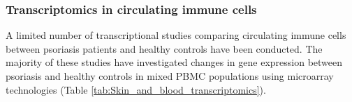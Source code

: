 \subsubsection{Transcriptomics in circulating immune cells}
A limited number of transcriptional studies comparing circulating immune cells between psoriasis patients and healthy controls have been conducted. The majority of these studies have investigated changes in gene expression between psoriasis and healthy controls in mixed PBMC populations using microarray technologies (Table \ref{tab:Skin_and_blood_transcriptomics}). 



